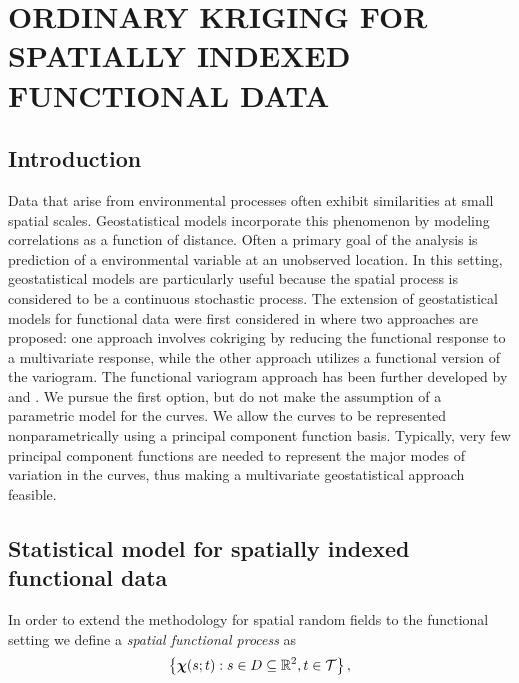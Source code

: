
\chapter{ORDINARY KRIGING FOR SPATIALLY INDEXED FUNCTIONAL DATA}
\label{ch:functional kriging}

\section{Introduction}


Data that arise from environmental processes often exhibit similarities at small spatial scales. Geostatistical models incorporate this phenomenon by  modeling correlations as a function of distance. Often a primary goal of the analysis is prediction of a environmental variable at an unobserved location. In this setting, geostatistical models are particularly useful because the spatial process is considered to be a continuous stochastic process. The extension of geostatistical models for functional data were first considered in \cite{Goulard:1993} where two approaches are proposed:  one approach involves cokriging by reducing the functional response to a multivariate response, while the other approach utilizes a functional version of the variogram.  The functional variogram approach has been further developed by \cite{Giraldo:2010jx} and \cite{Nerini:2010ba}. We pursue the first option, but do not make the assumption of a parametric model for the curves. We allow the curves to be represented nonparametrically using a principal component function basis. Typically, very few principal component functions are needed to represent the major modes of variation in the curves, thus making a multivariate geostatistical approach feasible. 

\section{Statistical model for spatially indexed functional data}

%
%
In order to extend the methodology for spatial random fields to the functional setting we define a \emph{spatial functional process} as 
	\[
	 \left\{ \boldsymbol\chi(s; t): s \in D  \subseteq  \mathbb{R} ^2, t \in \mathcal{T} \right\},
	 \] 
	 
